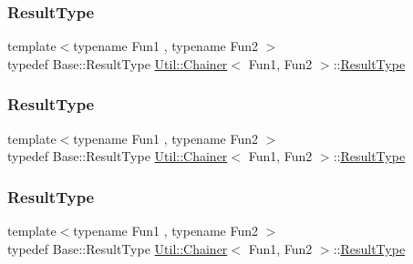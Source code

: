 \mbox{\label{classUtil_1_1Chainer_a2c8d88a77b8ba93eb915dc799ddafbb9}} 
\subsubsection{\texorpdfstring{ResultType}{ResultType}\hspace{0.1cm}{\footnotesize\ttfamily [1/3]}}
{\footnotesize\ttfamily template$<$typename Fun1 , typename Fun2 $>$ \\
typedef Base\+::\+Result\+Type \mbox{\hyperlink{classUtil_1_1Chainer}{Util\+::\+Chainer}}$<$ Fun1, Fun2 $>$\+::\mbox{\hyperlink{classUtil_1_1Chainer_a2c8d88a77b8ba93eb915dc799ddafbb9}{Result\+Type}}}

\mbox{\label{classUtil_1_1Chainer_a2c8d88a77b8ba93eb915dc799ddafbb9}} 
\subsubsection{\texorpdfstring{ResultType}{ResultType}\hspace{0.1cm}{\footnotesize\ttfamily [2/3]}}
{\footnotesize\ttfamily template$<$typename Fun1 , typename Fun2 $>$ \\
typedef Base\+::\+Result\+Type \mbox{\hyperlink{classUtil_1_1Chainer}{Util\+::\+Chainer}}$<$ Fun1, Fun2 $>$\+::\mbox{\hyperlink{classUtil_1_1Chainer_a2c8d88a77b8ba93eb915dc799ddafbb9}{Result\+Type}}}

\mbox{\label{classUtil_1_1Chainer_a2c8d88a77b8ba93eb915dc799ddafbb9}} 
\subsubsection{\texorpdfstring{ResultType}{ResultType}\hspace{0.1cm}{\footnotesize\ttfamily [3/3]}}
{\footnotesize\ttfamily template$<$typename Fun1 , typename Fun2 $>$ \\
typedef Base\+::\+Result\+Type \mbox{\hyperlink{classUtil_1_1Chainer}{Util\+::\+Chainer}}$<$ Fun1, Fun2 $>$\+::\mbox{\hyperlink{classUtil_1_1Chainer_a2c8d88a77b8ba93eb915dc799ddafbb9}{Result\+Type}}}



